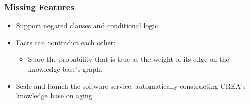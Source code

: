 \documentclass[mathserif]{beamer}
\begin{document}
\begin{frame}

\frametitle{Missing Features}

\begin{itemize}[<+->]

\item Support negated clauses and conditional logic.

\item Facts can contradict each other:
\begin{itemize}[<+->]
\item Store the probability that is true as the weight of its edge on the
knowledge base's graph.
\end{itemize}

\item Scale and launch the software service, automatically
constructing CREA's knowledge base on aging.

\end{itemize}

\end{frame}
\end{document}
